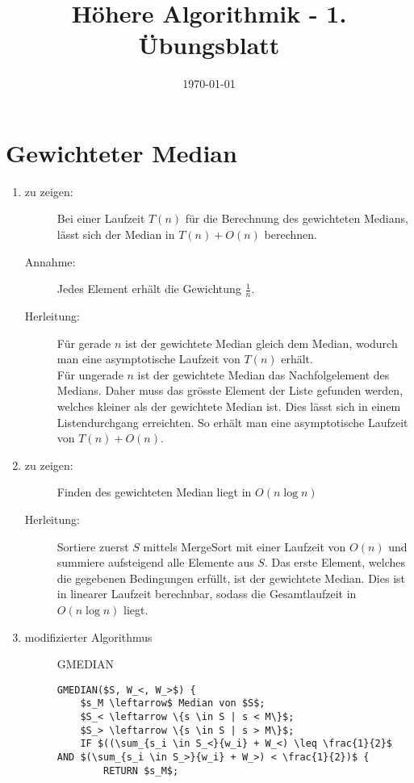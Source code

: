 \documentclass[a4paper,10pt]{scrartcl}
\title{H\"ohere Algorithmik - 1. \"Ubungsblatt}
\author{\Authors}
\date{\today}
\begin{document}
\maketitle

\section{Gewichteter Median}
\begin{enumerate}
\item \begin{description}
	\item[zu zeigen:] Bei einer Laufzeit $T(n)$ für die Berechnung des gewichteten Medians, lässt sich der Median in $T(n) + O(n)$ berechnen.
	\item[Annahme:] Jedes Element erhält die Gewichtung $\frac{1}{n}$.
	\item[Herleitung:] Für gerade $n$ ist der gewichtete Median gleich dem Median, wodurch man eine asymptotische Laufzeit von $T(n)$ erh\"alt.\\
Für ungerade $n$ ist der gewichtete Median das Nachfolgelement des Medians. Daher muss das gr\"osste Element der Liste gefunden werden, welches kleiner als der gewichtete Median ist. Dies lässt sich in einem Listendurchgang erreichten. So erh\"alt man eine asymptotische Laufzeit von $T(n) + O(n)$.
	\end{description}
\item   \begin{description}
	\item[zu zeigen:] Finden des gewichteten Median liegt in $O(n \log n)$
	\item[Herleitung:] Sortiere zuerst $S$ mittels MergeSort mit einer Laufzeit von $O(n)$ und summiere aufsteigend alle Elemente aus $S$. Das erste Element, welches die gegebenen Bedingungen erf\"ullt, ist der gewichtete Median. Dies ist in linearer Laufzeit berechnbar, sodass die Gesamtlaufzeit in $O(n \log n)$ liegt.
	\end{description}
\item  \begin{description}
	\item[modifizierter Algorithmus] GMEDIAN
	\begin{lstlisting}[mathescape=true]
GMEDIAN($S, W_<, W_>$) {
	$s_M \leftarrow$ Median von $S$;
	$S_< \leftarrow \{s \in S | s < M\}$;
	$S_> \leftarrow \{s \in S | s > M\}$;
	IF $((\sum_{s_i \in S_<}{w_i} + W_<) \leq \frac{1}{2}$ AND $(\sum_{s_i \in S_>}{w_i} + W_>) < \frac{1}{2})$ {
		RETURN $s_M$;

\end{lstlisting}
\end{description}
\end{enumerate}
\end{document}

